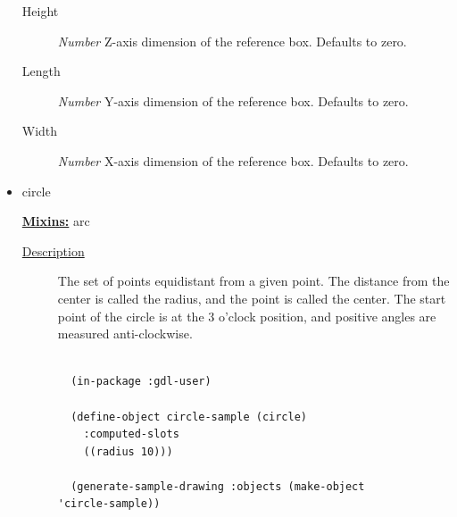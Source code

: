 \documentclass [11pt]{book}
\begin{document}
\begin{itemize}
\begin{description}
\item [Height]
\emph{Number} Z-axis dimension of the reference box. Defaults to zero.


\item [Length]
\emph{Number} Y-axis dimension of the reference box. Defaults to zero.


\item [Width]
\emph{Number} X-axis dimension of the reference box. Defaults to zero.


\end{description}







\item {}circle


\textbf{
\underline{Mixins:}} arc





\begin{description}

\item [
\underline{Description}]


The set of points equidistant from a given point. 
The distance from the center is called the radius, and the point is called 
the center. The start point of the circle is at the 3 o'clock position, and positive
angles are measured anti-clockwise.



\end{description}




\begin{figure}
\begin{lrbox}{\boxedverb}
\begin{minipage}{\linewidth}
{\small

\begin{verbatim}

  (in-package :gdl-user)
                  
  (define-object circle-sample (circle)
    :computed-slots
    ((radius 10)))

  (generate-sample-drawing :objects (make-object 'circle-sample))

                  

\end{verbatim}}
\end{minipage}
\end{lrbox}
\fbox{\usebox{\boxedverb}}


\end{figure}
\end{itemize}
\end{document}
